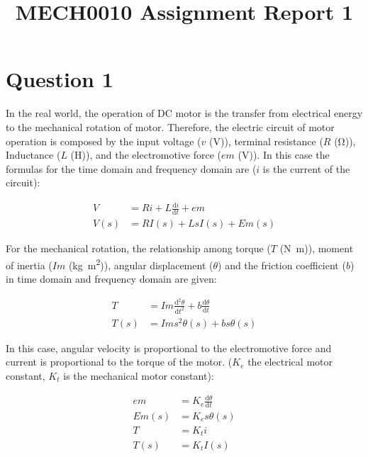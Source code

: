 \documentclass[conference]{IEEEtran}
\begin{document}
\title{MECH0010 Assignment Report 1
}

\author{
\and
{}
\and
{}
}

\maketitle

\section{Question 1}
In the real world, the operation of DC motor is the transfer from electrical energy to the mechanical rotation of motor. Therefore, the electric circuit of motor operation is composed by the input voltage ($v$ (\si{\volt})), terminal resistance ($R$ (\si{\ohm})), Inductance ($L$ (\si{\henry})), and the electromotive force ($em$ (\si{\volt})). In this case the formulas for the time domain and frequency domain are ($i$ is the current of the circuit):

\begin{align}
    V &= Ri + L \frac{\textrm{d}i}{\textrm{d} t} + em\\
    V(s) &= RI(s) + LsI(s) + Em(s) \label{ll1}
\end{align}

For the mechanical rotation, the relationship among torque ($T$ (\si{\newton\metre})), moment of inertia ($Im$ (\si{\kg\metre\squared})), angular displacement ($\theta$) and the friction coefficient ($b$) in time domain and frequency domain are given:

\begin{align}
    T &= Im \frac{\textrm{d}^2 \theta}{\textrm{d} t^2} + b \frac{\textrm{d} \theta}{\textrm{d} t}\\
    T(s) &= Ims^2 \theta(s) + bs\theta(s)\label{ll2}
\end{align}

In this case, angular velocity is proportional to the electromotive force and current is proportional to the torque of the motor. ($K_e$ the electrical motor constant, $K_t$ is the mechanical motor constant):

\begin{align}
    em &= K_e \frac{\textrm{d} \theta}{\textrm{d} t}\\
    Em(s) &= K_e s \theta(s)\\ \label{ll3}
    T &= K_t i\\
    T(s) &= K_t I(s) \label{ll4}
\end{align}
\end{document}

